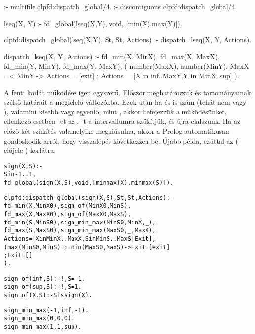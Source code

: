 \begin{prologcode}
:- multifile clpfd:dispatch_global/4.
:- discontiguous clpfd:dispatch_global/4.   %

lseq(X, Y) :-
        fd_global(lseq(X,Y), void, [min(X),max(Y)]).

clpfd:dispatch_global(lseq(X,Y), St, St, Actions) :-
        dispatch_lseq(X, Y, Actions).

dispatch_lseq(X, Y, Actions) :-
        fd_min(X, MinX), fd_max(X, MaxX),
        fd_min(Y, MinY), fd_max(Y, MaxY),
        (   number(MaxX), number(MinY), MaxX =< MinY
        ->  Actions = [exit]
        ;   Actions = [X in inf..MaxY,Y in MinX..sup]
        ).
\end{prologcode}

A fenti korlát működése igen egyszerű. Először meghatározzuk  és  tartományainak
szélső határait a megfelelő változókba. Ezek után ha  és  is szám
(tehát nem  vagy ), valamint  kisebb vagy egyenlő, mint ,
akkor befejezzük a működésünket, ellenkező esetben -et az , -t
a  intervallumra szűkítjük, és újra elalszunk. Ha az előző két szűkítés
valamelyike meghiúsulna, akkor a Prolog automatikusan gondoskodik arról, hogy visszalépés
következzen be.
\br
Újabb példa, ezúttal az  ( előjele ) korlátra:

\begin{alltt}
% X előjele S, globális korlátként megvalósítva.
sign(X, S) :-
        S in -1..1,
        fd_global(sign(X,S), void, [minmax(X),minmax(S)]).
        % Ébredés: X és S alsó és felső határának változásakor.

clpfd:dispatch_global(sign(X,S), St, St, Actions) :-
        fd_min(X, MinX0), sign_of(MinX0, MinS),
        fd_max(X, MaxX0), sign_of(MaxX0, MaxS),
        fd_min(S, MinS0), sign_min_max(MinS0, MinX, _),
        fd_max(S, MaxS0), sign_min_max(MaxS0, _, MaxX),
        Actions = [X in MinX..MaxX, S in MinS..MaxS|Exit],
        (   max(MinS0,MinS)=:=min(MaxS0,MaxS) -> Exit = [exit]
        ;   Exit = []
        ).

% sign_of(X, S): X egész vagy végtelen érték előjele S
sign_of(inf, S) :- !, S = -1.
sign_of(sup, S) :- !, S = 1.
sign_of(X, S) :- S is sign(X).

% sign_min_max(S, Min, Max): \(sign(x)=\cd{S} \Leftrightarrow x \in \cd{Min..Max}\)
sign_min_max(-1, inf, -1).
sign_min_max(0, 0, 0).
sign_min_max(1, 1, sup).
\end{alltt}

